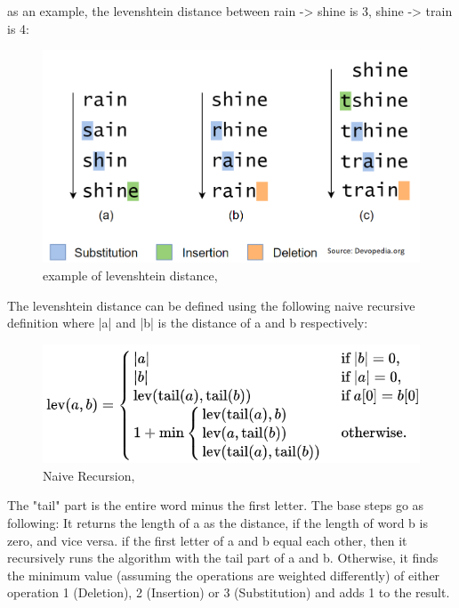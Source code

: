 as an example, the levenshtein distance between rain -> shine is 3, shine -> train is 4:
\begin{figure}[H]
  \centering
  \includegraphics[scale = 0.6]{figures/levenshtein_example.png}
  \caption{example of levenshtein distance, \cite{levenshtein_distance}}
\end{figure}

The levenshtein distance can be defined using the following naive recursive definition where |a| and |b| is the distance of a and b respectively:
\begin{figure}[H]
  \centering
  \includegraphics[scale = 0.7]{figures/levenshtein_recursive.png}
  \caption{Naive Recursion, \cite{levenshtein_recursive_definition}}
\end{figure}
The "tail" part is the entire word minus the first letter.
The base steps go as following: It returns the length of a as the distance, if the length of word b is zero, and vice versa.
if the first letter of a and b equal each other, then it recursively runs the algorithm with the tail part of a and b.
Otherwise, it finds the minimum value (assuming the operations are weighted differently) of either operation 1 (Deletion), 2 (Insertion) or 3 (Substitution) and adds 1 to the result.
\\

